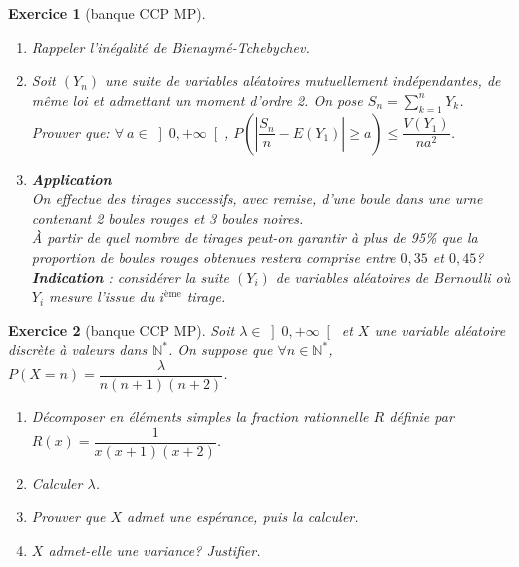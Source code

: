 \documentclass[12pt,a4paper]{article}
\newtheorem{Exo}{Exercice}
\begin{document}
\begin{Exo}[banque CCP MP]\ 
	\begin{enumerate}
	\item
	Rappeler l'inégalité de Bienaymé-Tchebychev.
	\item
	Soit $(Y_n)$ une suite de variables aléatoires mutuellement indépendantes, de même loi et admettant un moment d'ordre 2. On pose $S_n=\displaystyle\sum\limits_{k=1}^{n}Y_k$.\\
	
	Prouver que: $\forall\:a\in \left] 0,+\infty\right[ $, $P\left( \left|\dfrac{S_n}{n}-E(Y_1)\right|\geqslant a\right) \leqslant\dfrac{V(Y_1)}{na^2}$.
	\item \textbf{Application}\\
	On effectue des tirages successifs, avec remise, d'une boule dans une urne contenant 2 boules rouges et 3 boules noires.\\
	\`A partir de quel nombre de tirages peut-on garantir à plus de 95\% que la proportion de boules rouges obtenues restera comprise entre $0,35$ et $0,45$?\\
	\textbf{Indication} : considérer la suite $(Y_i)$ de variables aléatoires de Bernoulli où $Y_i$ mesure l'issue du $i^{\text{ème}}$  tirage.
	
\end{enumerate}
\end{Exo}




\begin{Exo}[banque CCP MP]
	Soit $\lambda \in{\left] 0,+\infty\right[ }$ et $X$ une variable aléatoire discrète à valeurs dans $\mathbb{N}^\ast$. On suppose que $\forall n\in\mathbb{N}^\ast$, $P(X=n)=\dfrac{\lambda}{n(n+1)(n+2)} $.
\begin{enumerate}
	\item Décomposer en éléments simples la fraction rationnelle $R$ définie par $R(x)=\dfrac{1}{x(x+1)(x+2)}$.
	\item
	Calculer $\lambda$.
	\item
	Prouver que $X$ admet une espérance, puis la calculer.
	\item
	$X$ admet-elle une variance? Justifier.
	
\end{enumerate}
\end{Exo}
\end{document}
